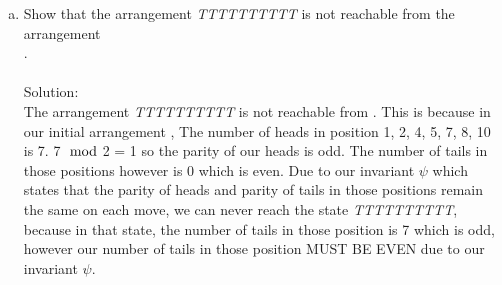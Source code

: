 \documentclass{article}
\newcommand*\moveToRight[1]{\hspace*{0em plus 1fill}\makebox{(#1)}}
\begin{document}
\begin{enumerate}[(a)]
    \item Show that the arrangement \textit{TTTTTTTTTT} is not reachable from the arrangement \\. \moveToRight{2 marks}\\\\
    Solution:\\
    The arrangement \textit{TTTTTTTTTT} is not reachable from . This is because in our initial arrangement , The number of heads in position 1, 2, 4, 5, 7, 8, 10 is 7. 7$\mod$2 = 1 so the parity of our heads is odd. The number of tails in those positions however is 0 which is even. Due to our invariant $\psi$ which states that the parity of heads and parity of tails in those positions remain the same on each move, we can never reach the state \textit{TTTTTTTTTT}, because in that state, the number of tails in those position is 7 which is odd, however our number of tails in those position MUST BE EVEN due to our invariant $\psi$.
\end{enumerate}

\newpage
\end{document}
